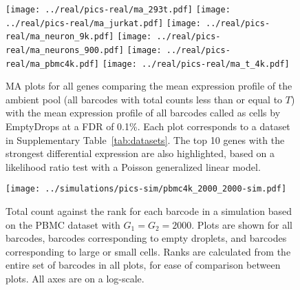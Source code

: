 \documentclass{article}
\begin{document}
\begin{figure}[btp]
    \begin{center}
        \texttt{[image: ../real/pics-real/ma\_293t.pdf]}
        \texttt{[image: ../real/pics-real/ma\_jurkat.pdf]}
        \texttt{[image: ../real/pics-real/ma\_neuron\_9k.pdf]}
        \texttt{[image: ../real/pics-real/ma\_neurons\_900.pdf]}
        \texttt{[image: ../real/pics-real/ma\_pbmc4k.pdf]}
        \texttt{[image: ../real/pics-real/ma\_t\_4k.pdf]}
    \end{center}
    \caption{MA plots for all genes comparing the mean expression profile of the ambient pool (all barcodes with total counts less than or equal to $T$) with the mean expression profile of all barcodes called as cells by EmptyDrops at a FDR of 0.1\%.
        Each plot corresponds to a dataset in Supplementary Table~\ref{tab:datasets}.
        The top 10 genes with the strongest differential expression are also highlighted, based on a likelihood ratio test with a Poisson generalized linear model.
    }
    \label{fig:ma}
\end{figure}

\begin{figure}[btp]
    \begin{center}
        \texttt{[image: ../simulations/pics-sim/pbmc4k\_2000\_2000-sim.pdf]}
    \end{center}
\caption{Total count against the rank for each barcode in a simulation based on the PBMC dataset with $G_1=G_2=2000$.
Plots are shown for all barcodes, barcodes corresponding to empty droplets, and barcodes corresponding to large or small cells.
Ranks are calculated from the entire set of barcodes in all plots, for ease of comparison between plots.
All axes are on a log-scale.}
\end{figure}
\end{document}
